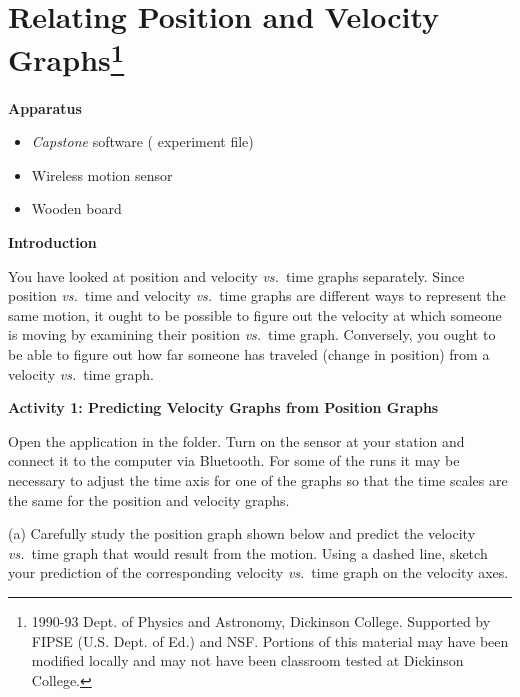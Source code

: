 
\section{Relating Position and Velocity Graphs\footnote{
1990-93 Dept. of Physics and Astronomy, Dickinson College. Supported by FIPSE
(U.S. Dept. of Ed.) and NSF. Portions of this material may have been modified
locally and may not have been classroom tested at Dickinson College.
}}


\makelabheader %

%

\bigskip

\textbf{Apparatus} 

\begin{itemize}[nosep]
\item \textit{Capstone} software ( experiment file)
\item Wireless motion sensor 
\item Wooden board
\end{itemize}

\bigskip
\textbf{Introduction} 

You have looked at position and velocity \textit{vs.}~time graphs separately. Since position
\textit{vs.}~time and velocity \textit{vs.}~time graphs are different ways to represent the same motion, it ought to be possible to figure out the velocity at which someone
is moving by examining their position \textit{vs.}~time graph. Conversely, you ought
to be able to figure out how far someone has traveled (change in position) from
a velocity \textit{vs.}~time graph.

\bigskip

\textbf{Activity 1: Predicting Velocity Graphs from Position Graphs} 

Open the  application in the \filename{\coursefolder} folder. Turn on the sensor at your station and connect it to the computer via Bluetooth. For some of the runs it may be necessary to adjust the time axis for one of the graphs so that the time scales are the same for the position and velocity graphs.

(a) Carefully study the position graph shown below and predict the velocity
\textit{vs.}~time graph that would result from the motion. Using a dashed line, sketch
your prediction of the corresponding velocity \textit{vs.}~time graph on the velocity
axes.


